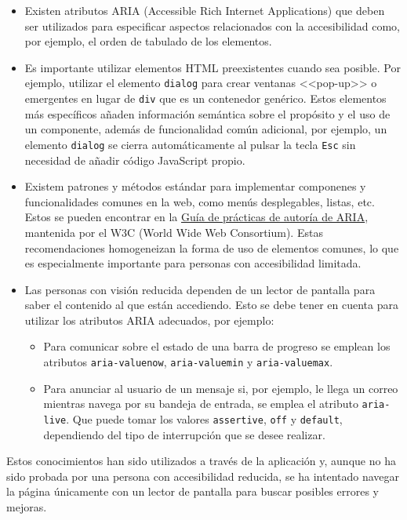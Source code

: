 \begin{itemize}
    \item Existen atributos ARIA (Accessible Rich Internet Applications) que
    deben ser utilizados para especificar aspectos relacionados con la
    accesibilidad como, por ejemplo, el orden de tabulado de los elementos.
    \item Es importante utilizar elementos HTML preexistentes cuando sea
    posible. Por ejemplo, utilizar el elemento \texttt{dialog} para crear
    ventanas <<pop-up>> o emergentes en lugar de \texttt{div} que es un
    contenedor genérico. Estos elementos más específicos añaden información
    semántica sobre el propósito y el uso de un componente, además de
    funcionalidad común adicional, por ejemplo, un elemento \texttt{dialog} se
    cierra automáticamente al pulsar la tecla \texttt{Esc} sin necesidad de
    añadir código JavaScript propio.
    \item Existem patrones y métodos estándar para implementar componenes y
    funcionalidades comunes en la web, como menús desplegables, listas, etc.
    Estos se pueden encontrar en la
    \href{https://www.w3.org/WAI/ARIA/apg/patterns/}{Guía de prácticas de
    autoría de ARIA}, mantenida por el W3C (World Wide Web Consortium). Estas
    recomendaciones homogeneizan la forma de uso de elementos comunes, lo que es
    especialmente importante para personas con accesibilidad limitada.
    \item Las personas con visión reducida dependen de un lector de pantalla
    para saber el contenido al que están accediendo. Esto se debe tener en
    cuenta para utilizar los atributos ARIA adecuados, por ejemplo:
        \begin{itemize}
            \item Para comunicar sobre el estado de una barra de progreso se
            emplean los atributos \texttt{aria-valuenow}, \texttt{aria-valuemin}
            y \texttt{aria-valuemax}.
            \item Para anunciar al usuario de un mensaje si, por ejemplo, le
            llega un correo mientras navega por su bandeja de entrada, se emplea
            el atributo \texttt{aria-live}. Que puede tomar los valores
            \texttt{assertive}, \texttt{off} y \texttt{default}, dependiendo del
            tipo de interrupción que se desee realizar.
        \end{itemize}
\end{itemize}

Estos conocimientos han sido utilizados a través de la aplicación y, aunque no
ha sido probada por una persona con accesibilidad reducida, se ha intentado
navegar la página únicamente con un lector de pantalla para buscar posibles
errores y mejoras.

